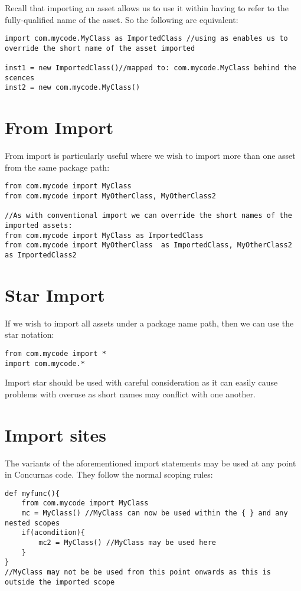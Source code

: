 \documentclass[conc-doc]{subfiles}
\begin{document}
Recall that importing an asset allows us to use it within having to refer to the fully-qualified name of the asset. So the following are equivalent:

\begin{lstlisting}
import com.mycode.MyClass as ImportedClass //using as enables us to override the short name of the asset imported

inst1 = new ImportedClass()//mapped to: com.mycode.MyClass behind the scences 
inst2 = new com.mycode.MyClass()
\end{lstlisting}

\section{From Import}
From import is particularly useful where we wish to import more than one asset from the same package path:
\begin{lstlisting}
from com.mycode import MyClass 
from com.mycode import MyOtherClass, MyOtherClass2

//As with conventional import we can override the short names of the imported assets:
from com.mycode import MyClass as ImportedClass
from com.mycode import MyOtherClass  as ImportedClass, MyOtherClass2  as ImportedClass2
\end{lstlisting}

\section{Star Import}
If we wish to import all assets under a package name path, then we can use the star notation:
\begin{lstlisting}
from com.mycode import *
import com.mycode.*
\end{lstlisting}

Import star should be used with careful consideration as it can easily cause problems with overuse as short names may conflict with one another.

\section{Import sites}
The variants of the aforementioned import statements may be used at any point in Concurnas code. They follow the normal scoping rules:
\begin{lstlisting}
def myfunc(){
	from com.mycode import MyClass
	mc = MyClass() //MyClass can now be used within the { } and any nested scopes
	if(acondition){
		mc2 = MyClass() //MyClass may be used here
	}
}
//MyClass may not be be used from this point onwards as this is outside the imported scope
\end{lstlisting}
\end{document}
